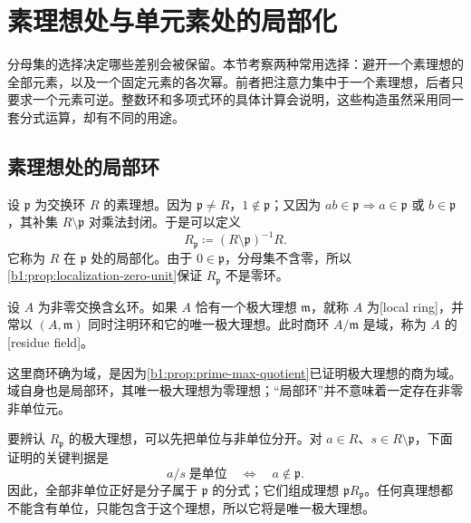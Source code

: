 
\section{素理想处与单元素处的局部化}
\label{b1:sec:1303}

分母集的选择决定哪些差别会被保留。本节考察两种常用选择：避开一个素理想的全部元素，以及一个固定元素的各次幂。前者把注意力集中于一个素理想，后者只要求一个元素可逆。整数环和多项式环的具体计算会说明，这些构造虽然采用同一套分式运算，却有不同的用途。

%
%

\subsection{素理想处的局部环}
\label{b1:subsec:1303:01}

设 \(\mathfrak p\) 为交换环 \(R\) 的素理想。因为 \(\mathfrak p\neq R\)，\(1\notin\mathfrak p\)；又因为 \(ab\in\mathfrak p\Longrightarrow a\in\mathfrak p\) 或 \(b\in\mathfrak p\)，其补集 \(R\setminus\mathfrak p\) 对乘法封闭。于是可以定义
\[
	R_{\mathfrak p}\coloneqq(R\setminus\mathfrak p)^{-1}R.
\]
它称为 \(R\) 在 \(\mathfrak p\) 处的局部化。由于 \(0\in\mathfrak p\)，分母集不含零，所以\cref{b1:prop:localization-zero-unit}保证 \(R_{\mathfrak p}\) 不是零环。

\begin{definition}\label{b1:def:local-ring}
	设 \(A\) 为非零交换含幺环。如果 \(A\) 恰有一个极大理想 \(\mathfrak m\)，就称 \(A\) 为[local ring]，并常以 \((A,\mathfrak m)\) 同时注明环和它的唯一极大理想。此时商环 \(A/\mathfrak m\) 是域，称为 \(A\) 的[residue field]。
\end{definition}
这里商环确为域，是因为\cref{b1:prop:prime-max-quotient}已证明极大理想的商为域。域自身也是局部环，其唯一极大理想为零理想；“局部环”并不意味着一定存在非零非单位元。

\ProseParagraphBreak
要辨认 \(R_{\mathfrak p}\) 的极大理想，可以先把单位与非单位分开。对 \(a\in R\)、\(s\in R\setminus\mathfrak p\)，下面证明的关键判据是
\[
	a/s\;\text{是单位}\quad\Longleftrightarrow\quad a\notin\mathfrak p.
\]
因此，全部非单位正好是分子属于 \(\mathfrak p\) 的分式；它们组成理想 \(\mathfrak pR_{\mathfrak p}\)。任何真理想都不能含有单位，只能包含于这个理想，所以它将是唯一极大理想。


